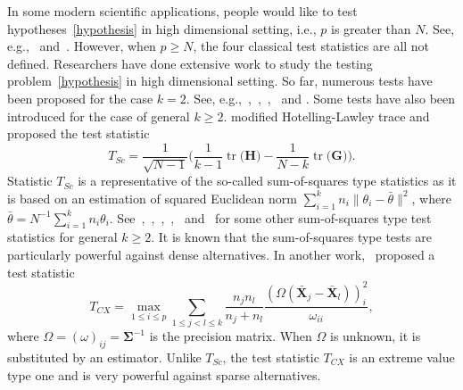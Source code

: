 \documentclass[12pt]{article} %
\DeclareMathOperator{\mytr}{tr}
\newcommand{\bX}{\mathbf{X}}
\newcommand{\bH}{\mathbf{H}}
\newcommand{\bG}{\mathbf{G}}
\newcommand{\bfsym}[1]{\ensuremath{\boldsymbol{#1}}}
\def\bSigma {\bfsym {\Sigma}}
\theoremstyle{definition}
\begin{document}


In some modern scientific applications, people would like to test hypotheses~\eqref{hypothesis} in high dimensional setting, i.e., $p$ is greater than $N$.
See, e.g.,~\citet{Verstynen1209} and~\citet{Tsai2009}.
However, when $p\geq N$, the four classical test statistics are all not defined.
  Researchers have done extensive work to study the testing problem~\eqref{hypothesis} in high dimensional setting.
 So far, numerous tests have been proposed for the case $k=2$.
 See, e.g.,~\citet{Bai1996Efiect},~\cite{Srivastava2007Multivariate},~\citet{Chen2010A},~\citet{Tony2013} and \citet{Feng2014Two}.
  Some tests have also been introduced for the case of general $k\geq 2$.
 \cite{Schott2007Some} modified Hotelling-Lawley trace and proposed the test statistic
  $$
  T_{Sc}=\frac{1}{\sqrt{N-1}}\Big(
  \frac{1}{k-1}\mytr\big(\bH\big)-\frac{1}{N-k}\mytr\big(\bG\big)
  \Big).
  $$
Statistic $T_{Sc}$ is a representative of the so-called sum-of-squares type statistics as it is based on an estimation of squared Euclidean norm $\sum_{i=1}^k n_i\|\theta_i-\bar{\theta}\|^2$, where $\bar{\theta}=N^{-1}\sum_{i=1}^k n_i \theta_i$.
See~\cite{Srivastava2013},~\cite{Yamada2015},~\cite{Hu2017},~\cite{ZHANG2017200},~\cite{Chang2017} and~\cite{2017arXiv171007878C} for some other sum-of-squares type test statistics for general $k\geq 2$.
It is known that the sum-of-squares type tests are particularly powerful against dense alternatives.
In another work,~\cite{Cai2014High} proposed a test statistic 
  $$
  T_{CX}=\max_{1\leq i\leq p} \sum_{1\leq j<l\leq k}\frac{n_j n_l}{n_j+n_l}\frac{(\Omega(\bar{\bX}_j-\bar{\bX}_l))_i^2}{\omega_{ii}},
  $$
  where $\Omega=(\omega)_{ij}=\bSigma^{-1}$ is the precision matrix. When $\Omega$ is unknown, it is substituted by an estimator.
  Unlike $T_{Sc}$, the test statistic $T_{CX}$ is an extreme value type one and is very powerful against sparse alternatives.
  
\end{document}
